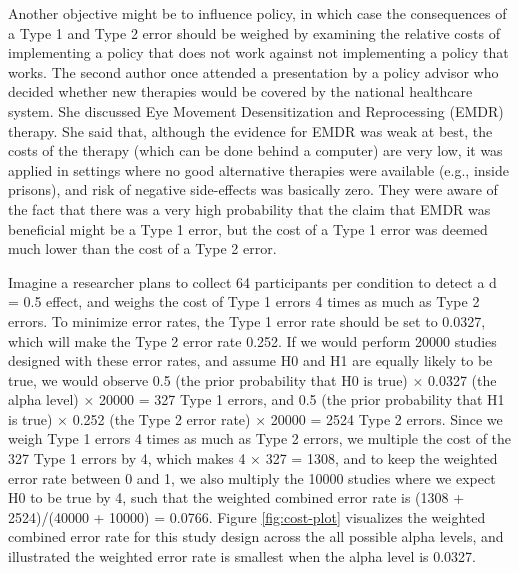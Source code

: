 \documentclass[
  english,
  ,man, a4paper,floatsintext]{apa6}
\begin{document}
Another objective might be to influence policy, in which case the consequences of a Type 1 and Type 2 error should be weighed by examining the relative costs of implementing a policy that does not work against not implementing a policy that works. The second author once attended a presentation by a policy advisor who decided whether new therapies would be covered by the national healthcare system. She discussed Eye Movement Desensitization and Reprocessing (EMDR) therapy. She said that, although the evidence for EMDR was weak at best, the costs of the therapy (which can be done behind a computer) are very low, it was applied in settings where no good alternative therapies were available (e.g., inside prisons), and risk of negative side-effects was basically zero. They were aware of the fact that there was a very high probability that the claim that EMDR was beneficial might be a Type 1 error, but the cost of a Type 1 error was deemed much lower than the cost of a Type 2 error.

Imagine a researcher plans to collect 64 participants per condition to detect a d = 0.5 effect, and weighs the cost of Type 1 errors 4 times as much as Type 2 errors. To minimize error rates, the Type 1 error rate should be set to 0.0327, which will make the Type 2 error rate 0.252. If we would perform 20000 studies designed with these error rates, and assume H0 and H1 are equally likely to be true, we would observe 0.5 (the prior probability that H0 is true) × 0.0327 (the alpha level) × 20000 = 327 Type 1 errors, and 0.5 (the prior probability that H1 is true) × 0.252 (the Type 2 error rate) × 20000 = 2524 Type 2 errors. Since we weigh Type 1 errors 4 times as much as Type 2 errors, we multiple the cost of the 327 Type 1 errors by 4, which makes 4 × 327 = 1308, and to keep the weighted error rate between 0 and 1, we also multiply the 10000 studies where we expect H0 to be true by 4, such that the weighted combined error rate is (1308 + 2524)/(40000 + 10000) = 0.0766. Figure \ref{fig:cost-plot} visualizes the weighted combined error rate for this study design across the all possible alpha levels, and illustrated the weighted error rate is smallest when the alpha level is 0.0327.
\end{document}
